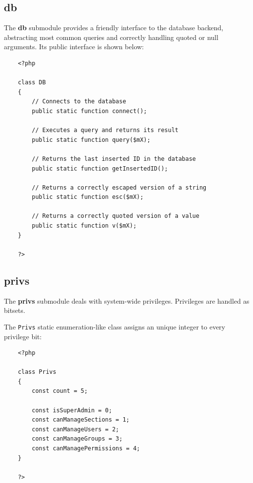 \documentclass[12pt]{report}
\renewcommand\emph{\textbf}
\begin{document}
                \subsection{db}

                     The \emph{db} submodule provides a friendly interface to the database backend, abstracting most common queries and correctly handling quoted or null arguments.
                     Its public interface is shown below:

                    \begin{verbatim}
    <?php

    class DB
    {
        // Connects to the database
        public static function connect();

        // Executes a query and returns its result
        public static function query($mX);

        // Returns the last inserted ID in the database
        public static function getInsertedID();

        // Returns a correctly escaped version of a string
        public static function esc($mX);

        // Returns a correctly quoted version of a value
        public static function v($mX);
    }

    ?>
                    \end{verbatim}


                \subsection{privs}

                    The \emph{privs} submodule deals with system-wide privileges. Privileges are handled as bitsets.

                    The \texttt{Privs} static enumeration-like class assigns an unique integer to every privilege bit:

                    \begin{verbatim}
    <?php

    class Privs
    {
        const count = 5;

        const isSuperAdmin = 0;
        const canManageSections = 1;
        const canManageUsers = 2;
        const canManageGroups = 3;
        const canManagePermissions = 4;
    }

    ?>
                    \end{verbatim}
\end{document}
